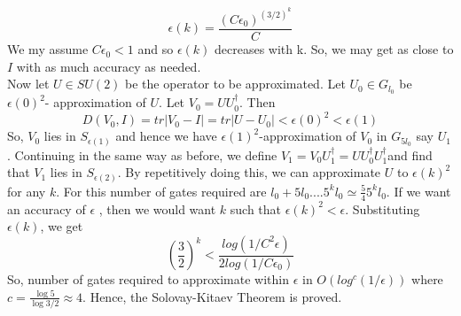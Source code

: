 \begin{equation}
\epsilon(k) = \frac{(C \epsilon_0)^{(3/2)^k}}{C}
\end{equation}We my assume $C\epsilon_0 < 1$ and so $\epsilon(k)$ decreases with k. So, we may get as close to $I$ with as much accuracy as needed.\\
Now let $U \in SU(2)$ be the operator to be approximated. Let $U_0\in G_{l_0}$ be $\epsilon(0)^2$- approximation of $U$. Let $V_0 = UU_0^\dagger$. Then
\begin{equation}
D(V_0,I) = tr|V_0 - I| = tr|U-U_0| < \epsilon(0)^2 < \epsilon(1)
\end{equation}So, $V_0$ lies in $S_{\epsilon(1)}$ and hence we have $\epsilon(1)^2$-approximation of $V_0$ in $G_{5l_0}$ say $U_1$. Continuing in the same way as before, we define $V_1 = V_0U_1^\dagger = UU_0^\dagger U_1^\dagger$and find that $V_1$ lies in $S_{\epsilon(2)}$. By repetitively doing this, we can approximate $U$ to $\epsilon(k)^2$ for any $k$. For this number of gates required are $l_0 + 5l_0 .... 5^k l_0 \simeq \frac{5}{4}5^k l_0$. If we want an accuracy of $\epsilon$ , then we would want $k$ such that $\epsilon(k)^2 < \epsilon$. Substituting $\epsilon(k)$, we get
\begin{equation}
\left( \frac{3}{2} \right)^k < \frac{log(1/C^2\epsilon)}{2log(1/C\epsilon_0)}
\end{equation}So, number of gates required to approximate within $\epsilon$ in $O(log^c(1/\epsilon))$ where $c = \frac{\log{5}}{\log{3/2}} \approx 4$. Hence, the Solovay-Kitaev Theorem is proved.
\newpage
